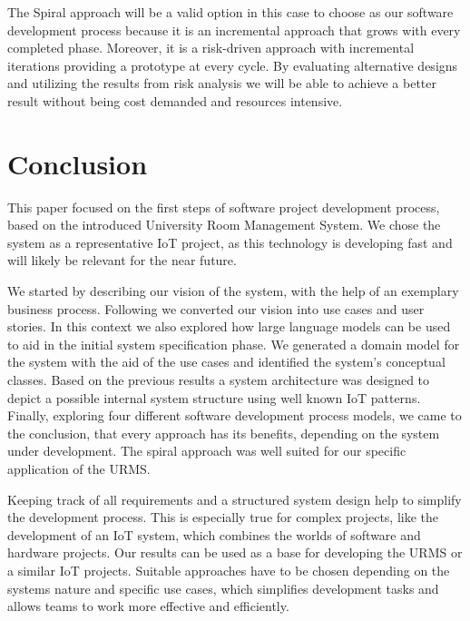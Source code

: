 \documentclass[conference,onecolumn]{IEEEtran}
\begin{document}
The Spiral approach will be a valid option in this case to choose as our software development process because it is an incremental approach that grows with every completed phase. Moreover, it is a risk-driven approach with incremental iterations providing a prototype at every cycle. By evaluating alternative designs and utilizing the results from risk analysis we will be able to achieve a better result without being cost demanded and resources intensive.

\section{Conclusion}

This paper focused on the first steps of software project development process, based on the introduced University Room Management System.
We chose the system as a representative IoT project, as this technology is developing fast and will likely be relevant for the near future.

We started by describing our vision of the system, with the help of an exemplary business process.
Following we converted our vision into use cases and user stories.
In this context we also explored how large language models can be used to aid in the initial system specification phase.
We generated a domain model for the system with the aid of the use cases and identified the system's conceptual classes.
Based on the previous results a system architecture was designed to depict a possible internal system structure using well known IoT patterns.
Finally, exploring four different software development process models, we came to the conclusion, that every approach has its benefits, depending on the system under development. The spiral approach was well suited for our specific application of the URMS.

Keeping track of all requirements and a structured system design help to simplify the development process. This is especially true for complex projects, like the development of an IoT system, which combines the worlds of software and hardware projects.
Our results can be used as a base for developing the URMS or a similar IoT projects. Suitable approaches have to be chosen depending on the systems nature and specific use cases, which simplifies development tasks and allows teams to work more effective and efficiently.

\newpage
\appendix
\end{document}
